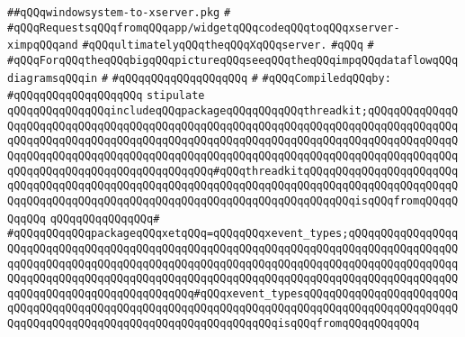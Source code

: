 \label{src/lib/x-kit/xclient/src/window/windowsystem-to-xserver.pkg}
\verb|##qQQqwindowsystem-to-xserver.pkg|\newline
\verb|#|\newline
\verb|#qQQqRequestsqQQqfromqQQqapp/widgetqQQqcodeqQQqtoqQQqxserver-ximpqQQqand|\newline
\verb|#qQQqultimatelyqQQqtheqQQqXqQQqserver.|\newline
\verb|#qQQq|\newline
\verb|#|\newline
\verb|#qQQqForqQQqtheqQQqbigqQQqpictureqQQqseeqQQqtheqQQqimpqQQqdataflowqQQqdiagramsqQQqin|\newline
\verb|#|\newline
\verb|#qQQqqQQqqQQqqQQqqQQq|\newline
\verb|#|\newline
\newline
\verb|#qQQqCompiledqQQqby:|\newline
\verb|#qQQqqQQqqQQqqQQqqQQq|\newline
\newline
\newline
\newline
\verb|stipulate|\newline
\verb|qQQqqQQqqQQqqQQqincludeqQQqpackageqQQqqQQqqQQqthreadkit;qQQqqQQqqQQqqQQqqQQqqQQqqQQqqQQqqQQqqQQqqQQqqQQqqQQqqQQqqQQqqQQqqQQqqQQqqQQqqQQqqQQqqQQqqQQqqQQqqQQqqQQqqQQqqQQqqQQqqQQqqQQqqQQqqQQqqQQqqQQqqQQqqQQqqQQqqQQqqQQqqQQqqQQqqQQqqQQqqQQqqQQqqQQqqQQqqQQqqQQqqQQqqQQqqQQqqQQqqQQqqQQqqQQqqQQqqQQqqQQqqQQqqQQqqQQqqQQq#qQQqthreadkitqQQqqQQqqQQqqQQqqQQqqQQqqQQqqQQqqQQqqQQqqQQqqQQqqQQqqQQqqQQqqQQqqQQqqQQqqQQqqQQqqQQqqQQqqQQqqQQqqQQqqQQqqQQqqQQqqQQqqQQqqQQqqQQqqQQqqQQqqQQqqQQqqQQqisqQQqfromqQQqqQQqqQQq|\newline
\verb|qQQqqQQqqQQqqQQq#|\newline
\verb|#qQQqqQQqqQQqpackageqQQqxetqQQq=qQQqqQQqxevent_types;qQQqqQQqqQQqqQQqqQQqqQQqqQQqqQQqqQQqqQQqqQQqqQQqqQQqqQQqqQQqqQQqqQQqqQQqqQQqqQQqqQQqqQQqqQQqqQQqqQQqqQQqqQQqqQQqqQQqqQQqqQQqqQQqqQQqqQQqqQQqqQQqqQQqqQQqqQQqqQQqqQQqqQQqqQQqqQQqqQQqqQQqqQQqqQQqqQQqqQQqqQQqqQQqqQQqqQQqqQQqqQQqqQQqqQQqqQQqqQQqqQQqqQQqqQQqqQQq#qQQqxevent_typesqQQqqQQqqQQqqQQqqQQqqQQqqQQqqQQqqQQqqQQqqQQqqQQqqQQqqQQqqQQqqQQqqQQqqQQqqQQqqQQqqQQqqQQqqQQqqQQqqQQqqQQqqQQqqQQqqQQqqQQqqQQqqQQqqQQqqQQqisqQQqfromqQQqqQQqqQQq|\newline
